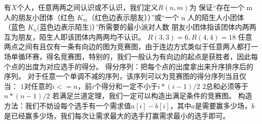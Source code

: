 {}
\markdownRendererSectionEnd 
\markdownRendererSectionEnd \markdownRendererSectionBegin
{}\markdownRendererInterblockSeparator
{}有$ X $个人，任意两两之间认识或不认识，我们定义$ R(n,m) $为 保证“存在一个 m 人的朋友小团体（红色 $ K_m $（红色边表示朋友））”或“一个 n 人的陌生人小团体（蓝色 $ K_n $(蓝色边表示陌生)）”所需要的最小派对人数\markdownRendererParagraphSeparator
{}朋友小团体指该团体内两两互为朋友，陌生人即该团体内两两均不认识。\markdownRendererParagraphSeparator
{}$ R(3,3)=6,R(4,4)=18 $\markdownRendererInterblockSeparator
{}
\markdownRendererSectionEnd \markdownRendererSectionBegin
{}\markdownRendererInterblockSeparator
{}任意两点之间有且仅有一条有向边的图为竞赛图，由于连边方式类似于任意两人都打一场单循环赛，得名竞赛图，特别的，我们一般认为有向边的起点是获胜者，因此每个点的出度为对应选手的得分。\markdownRendererParagraphSeparator
{}得分序列：把每个点的出度拿出来升序排序后的序列。\markdownRendererParagraphSeparator
{}\markdownRendererSectionBegin
\markdownRendererSectionBegin
{}\markdownRendererInterblockSeparator
{}对于任意一个单调不减的序列，该序列可以为竞赛图的得分序列当且仅当：\markdownRendererParagraphSeparator
{}$ 1 $对任意的$ i<=n $，前$ i $个得分和一定不小于$ i*(i-1)/2 $\markdownRendererParagraphSeparator
{}$ 2 $总和必须等于$ n*(n-1)/2 $\markdownRendererParagraphSeparator
{}若满足兰道定理，我们一定可以构造出满足条件的竞赛图。\markdownRendererParagraphSeparator
{}构造方法：我们不妨设每个选手有一个需求值$ a[i]-b[i] $，其中$ a $是需要赢多少场，$ b $是已经赢多少场，我们每次让需求最大的选手打赢需求最小的选手即可。\markdownRendererInterblockSeparator
{}
\markdownRendererSectionEnd 
\markdownRendererSectionEnd 
\markdownRendererSectionEnd \markdownRendererSectionBegin
{}\markdownRendererInterblockSeparator
